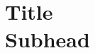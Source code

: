 

\def\thetitle{Title\\Subhead}
\def\shorttitle{Title}
\def\theauthors{\textit{Parting Thots} by Geoffrey Challen}
\def\shortauthors{Challen}


\pagestyle{document}
\thispagestyle{emptydocument}
\chapter{\thetitle}


